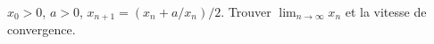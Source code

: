 $x_0 > 0$, $a > 0$, $x_{n+1} = (x_n + a/x_n)/2$. Trouver $\lim_{n\to\infty} x_n$ et la vitesse de convergence.
